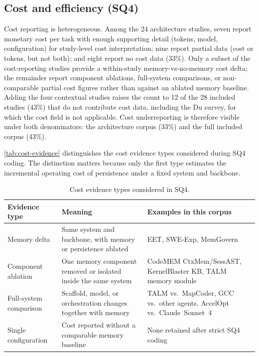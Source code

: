 \FloatBarrier
\subsection{Cost and efficiency (SQ4)}
\label{sec:sq4}

Cost reporting is heterogeneous.
Among the 24 architecture studies, seven report monetary cost per task
with enough supporting detail (tokens, model, configuration) for
study-level cost interpretation;
nine report partial data (cost or tokens, but not both);
and eight report no cost data (33\%).
Only a subset of the cost-reporting studies provide a within-study
memory-vs-no-memory cost delta;
the remainder report component ablations, full-system comparisons, or
non-comparable partial cost figures rather than against an ablated
memory baseline.
Adding the four contextual studies raises the count to 12 of the 28
included studies (43\%) that do not contribute cost data, including
the Du survey, for which the cost field is not applicable.
Cost underreporting is therefore visible under both denominators:
the architecture corpus (33\%) and the full included corpus (43\%).

\autoref{tab:cost-evidence} distinguishes the cost evidence types
considered during SQ4 coding.
The distinction matters because only the first type estimates the
incremental operating cost of persistence under a fixed system and
backbone.

\begin{table}[htbp]
  \centering
  \caption{Cost evidence types considered in SQ4.}
  \label{tab:cost-evidence}
  \small
  \begin{tabularx}{\textwidth}{@{} l X X @{}}
    \toprule
    Evidence type & Meaning & Examples in this corpus \\
    \midrule
    Memory delta &
      Same system and backbone, with memory or persistence ablated &
      EET, SWE-Exp, MemGovern \\
    Component ablation &
      One memory component removed or isolated inside the same system &
      CodeMEM CtxMem/SessAST, KernelBlaster KB, TALM memory module \\
    Full-system comparison &
      Scaffold, model, or orchestration changes together with memory &
      TALM vs.\ MapCoder, GCC vs.\ other agents, AccelOpt vs.\
      Claude~Sonnet~4 \\
    Single configuration &
      Cost reported without a comparable memory baseline &
      None retained after strict SQ4 coding \\
    \bottomrule
  \end{tabularx}
\end{table}

